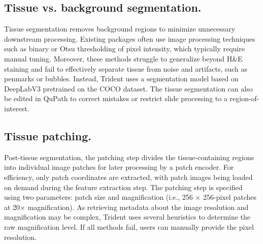 \subsection{Tissue vs. background segmentation.}
Tissue segmentation removes background regions to minimize unnecessary downstream processing. Existing packages often use image processing techniques such as binary or Otsu thresholding of pixel intensity, which typically require manual tuning. Moreover, these methods struggle to generalize beyond H\&E staining and fail to effectively separate tissue from noise and artifacts, such as penmarks or bubbles. Instead, Trident uses a segmentation model based on DeepLabV3 pretrained on the COCO dataset\cite{jaumeHEST1kDatasetSpatial2024}. The tissue segmentation can also be edited in QuPath\cite{bankheadQuPathOpenSource2017} to correct mistakes or restrict slide processing to a region-of-interest.


\subsection{Tissue patching.}
Post-tissue segmentation, the patching step divides the tissue-containing regions into individual image patches for later processing by a patch encoder. For efficiency, only patch coordinates are extracted, with patch images being loaded on demand during the feature extraction step. The patching step is specified using two parameters: patch size and magnification (i.e., 256 $\times$ 256-pixel patches at 20$\times$ magnification).
As retrieving metadata about the image resolution and magnification may be complex, Trident uses several heuristics to determine the raw magnification level. If all methods fail, users can manually provide the pixel resolution.


